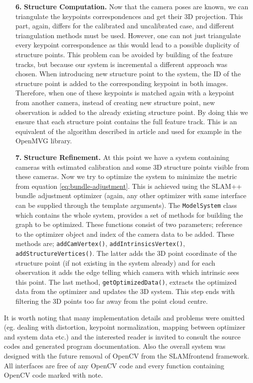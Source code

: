\begin{itemize}
\item[\textbf{6.}] \textbf{Structure Computation.}
Now that the camera poses are known, we can triangulate the keypoints correspondences and get their 3D projection. This part, again, differs for the calibrated and uncalibrated case, and different triangulation methods must be used. However, one can not just triangulate every keypoint correspondence as this would lead to a possible duplicity of structure points. This problem can be avoided by building of the feature tracks, but because our system is incremental a different approach was chosen. When introducing new structure point to the system, the ID of the structure point is added to the corresponding keypoint in both images. Therefore, when one of these keypoints is matched again with a keypoint from another camera, instead of creating new structure point, new observation is added to the already existing structure point. By doing this we ensure that each structure point contains the full feature track. This is an equivalent of the algorithm described in article \cite{feature-tracking} and used for example in the OpenMVG library.

\item[\textbf{7.}]  \textbf{Structure Refinement.} At this point we have a system containing cameras with estimated calibration and some 3D structure points visible from these cameras. Now we try to optimize the system to minimize the metric from equation \ref{eq:bundle-adjustment}. This is achieved using the SLAM++ bundle adjustment optimizer (again, any other optimizer with same interface can be supplied through the template arguments). The \texttt{ModelSystem} class which contains the whole system, provides a set of methods for building the graph to be optimized. These functions consist of two parameters; reference to the optimizer object and index of the camera data to be added. These methods are; \texttt{addCamVertex()}, \texttt{addIntrinsicsVertex()}, \texttt{addStructureVertices()}. The latter adds the 3D point coordinate of the structure point (if not existing in the system already) and for each observation it adds the edge telling which camera with which intrinsic sees this point. The last method, \texttt{getOptimizedData()}, extracts the optimized data from the optimizer and updates the 3D system. This step ends with filtering the 3D points too far away from the point cloud centre.

\end{itemize}
It is worth noting that many implementation details and problems were omitted (eg. dealing with distortion, keypoint normalization, mapping between optimizer and system data etc.) and the interested reader is invited to consult the source codes and generated program documentation. Also the overall system was designed with the future removal of OpenCV from the SLAM\textunderscore frontend framework. All interfaces are free of any OpenCV code and every function containing OpenCV code marked with note.

